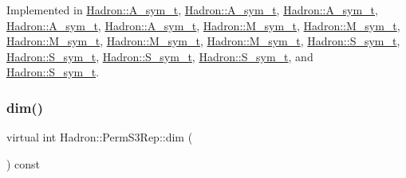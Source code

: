 Implemented in \mbox{\hyperlink{structHadron_1_1A__sym__t_a57e9460ee09050859f969d1f0cae0e92}{Hadron\+::\+A\+\_\+sym\+\_\+t}}, \mbox{\hyperlink{structHadron_1_1A__sym__t_a57e9460ee09050859f969d1f0cae0e92}{Hadron\+::\+A\+\_\+sym\+\_\+t}}, \mbox{\hyperlink{structHadron_1_1A__sym__t_a57e9460ee09050859f969d1f0cae0e92}{Hadron\+::\+A\+\_\+sym\+\_\+t}}, \mbox{\hyperlink{structHadron_1_1A__sym__t_a57e9460ee09050859f969d1f0cae0e92}{Hadron\+::\+A\+\_\+sym\+\_\+t}}, \mbox{\hyperlink{structHadron_1_1A__sym__t_a57e9460ee09050859f969d1f0cae0e92}{Hadron\+::\+A\+\_\+sym\+\_\+t}}, \mbox{\hyperlink{structHadron_1_1M__sym__t_a9ee8ba6fd6c2220231052690b2995ed5}{Hadron\+::\+M\+\_\+sym\+\_\+t}}, \mbox{\hyperlink{structHadron_1_1M__sym__t_a9ee8ba6fd6c2220231052690b2995ed5}{Hadron\+::\+M\+\_\+sym\+\_\+t}}, \mbox{\hyperlink{structHadron_1_1M__sym__t_a9ee8ba6fd6c2220231052690b2995ed5}{Hadron\+::\+M\+\_\+sym\+\_\+t}}, \mbox{\hyperlink{structHadron_1_1M__sym__t_a9ee8ba6fd6c2220231052690b2995ed5}{Hadron\+::\+M\+\_\+sym\+\_\+t}}, \mbox{\hyperlink{structHadron_1_1M__sym__t_a9ee8ba6fd6c2220231052690b2995ed5}{Hadron\+::\+M\+\_\+sym\+\_\+t}}, \mbox{\hyperlink{structHadron_1_1S__sym__t_ae8b1558dc91f46f5d78de03f1e587dc0}{Hadron\+::\+S\+\_\+sym\+\_\+t}}, \mbox{\hyperlink{structHadron_1_1S__sym__t_ae8b1558dc91f46f5d78de03f1e587dc0}{Hadron\+::\+S\+\_\+sym\+\_\+t}}, \mbox{\hyperlink{structHadron_1_1S__sym__t_ae8b1558dc91f46f5d78de03f1e587dc0}{Hadron\+::\+S\+\_\+sym\+\_\+t}}, \mbox{\hyperlink{structHadron_1_1S__sym__t_ae8b1558dc91f46f5d78de03f1e587dc0}{Hadron\+::\+S\+\_\+sym\+\_\+t}}, and \mbox{\hyperlink{structHadron_1_1S__sym__t_ae8b1558dc91f46f5d78de03f1e587dc0}{Hadron\+::\+S\+\_\+sym\+\_\+t}}.

\mbox{\label{structHadron_1_1PermS3Rep_a4ce8c9c9367b6120769feae38d2f5372}} 
\subsubsection{\texorpdfstring{dim()}{dim()}\hspace{0.1cm}{\footnotesize\ttfamily [2/3]}}
{\footnotesize\ttfamily virtual int Hadron\+::\+Perm\+S3\+Rep\+::dim (\begin{DoxyParamCaption}{ }\end{DoxyParamCaption}) const\hspace{0.3cm}{\ttfamily [pure virtual]}}



